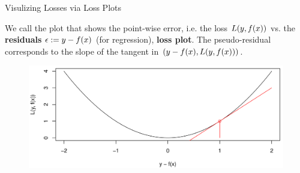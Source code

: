 \begin{vbframe}{Visulizing Losses via Loss Plots}

We call the plot that shows the point-wise error, i.e. the loss $L(y, f(x))$ vs. the \textbf{residuals} $\epsilon := y - f(x)$ (for regression), \textbf{loss plot}. The pseudo-residual corresponds to the slope of the tangent in $\left(y - f(x), L(y, f(x)) \right)$. 

\vspace*{0.5cm}


\begin{figure}
\includegraphics[width = 1\linewidth]{figure_man/loss.png}
\end{figure}



\end{vbframe}
















